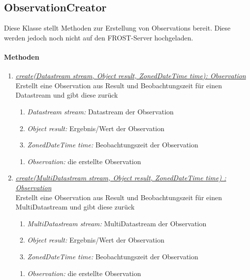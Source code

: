 
\subsection*{ObservationCreator}\label{obsCreator}

Diese Klasse stellt Methoden zur Erstellung von Observations bereit.
Diese werden jedoch noch nicht auf den FROST-Server hochgeladen.

\paragraph{Methoden}

\begin{enumerate}[+]

	\item \underline{\textit{create(Datastream stream, Object result, ZonedDateTime time): Observation}} \\
	Erstellt eine Observation aus Result und Beobachtungszeit für einen Datastream und gibt diese zurück	
	\begin{enumerate}[$\bullet$]
		\item \textit{Datastream stream:} Datastream der Observation
		\item \textit{Object result:} Ergebnis/Wert der Observation
		\item \textit{ZonedDateTime time:} Beobachtungszeit der Observation
	\end{enumerate}
	\vspace{-0.2cm}
	\begin{enumerate}[$\circ$]
		\item \textit{Observation:} die erstellte Observation
	\end{enumerate}
	
	\item \underline{\textit{create(MultiDatastream stream, Object result, ZonedDateTime time) : Observation}} \\
	Erstellt eine Observation aus Result und Beobachtungszeit für einen MultiDatastream und gibt diese zurück	
	\begin{enumerate}[$\bullet$]
		\item \textit{MultiDatastream stream:} MultiDatastream der Observation
		\item \textit{Object result:} Ergebnis/Wert der Observation
		\item \textit{ZonedDateTime time:} Beobachtungszeit der Observation
	\end{enumerate}
	\vspace{-0.2cm}
	\begin{enumerate}[$\circ$]
		\item \textit{Observation:} die erstellte Observation
	\end{enumerate}
	

\end{enumerate}
